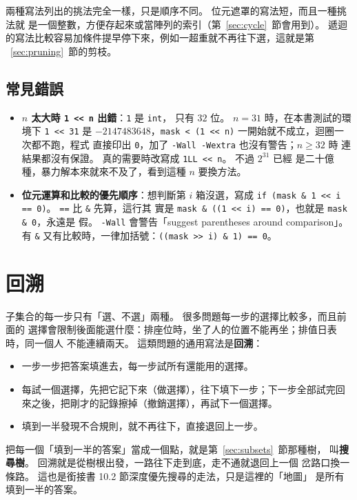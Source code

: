 兩種寫法列出的挑法完全一樣，只是順序不同。 位元遮罩的寫法短，而且一種挑法就
是一個整數，方便存起來或當陣列的索引（第~\ref{sec:cycle}~節會用到）。 遞迴
的寫法比較容易加條件提早停下來，例如一超重就不再往下選，這就是第
~\ref{sec:pruning}~節的剪枝。

\subsection{常見錯誤}

\begin{itemize}
\item \textbf{$n$ 太大時 \texttt{1 << n} 出錯}：\texttt{1} 是 \texttt{int}，
只有 $32$ 位。 $n = 31$ 時，在本書測試的環境下 \texttt{1 << 31} 是
$-2147483648$，\texttt{mask < (1 << n)} 一開始就不成立，迴圈一次都不跑，程式
直接印出 \texttt{0}，加了 \texttt{-Wall -Wextra} 也沒有警告；$n \ge 32$ 時
連結果都沒有保證。 真的需要時改寫成 \texttt{1LL << n}。 不過 $2^{31}$ 已經
是二十億種，暴力解本來就來不及了，看到這種 $n$ 要換方法。
\item \textbf{位元運算和比較的優先順序}：想判斷第 $i$ 箱沒選，寫成
\texttt{if (mask \& 1 << i == 0)}。 \texttt{==} 比 \texttt{\&} 先算，這行其
實是 \texttt{mask \& ((1 << i) == 0)}，也就是 \texttt{mask \& 0}，永遠是
假。 \texttt{-Wall} 會警告「suggest parentheses around comparison」。 有
\texttt{\&} 又有比較時，一律加括號：\texttt{((mask >> i) \& 1) == 0}。
\end{itemize}

\section{回溯}
\label{sec:backtracking}

子集合的每一步只有「選、不選」兩種。 很多問題每一步的選擇比較多，而且前面的
選擇會限制後面能選什麼：排座位時，坐了人的位置不能再坐；排值日表時，同一個人
不能連續兩天。 這類問題的通用寫法是\textbf{回溯}：

\begin{itemize}
\item 一步一步把答案填進去，每一步試所有還能用的選擇。
\item 每試一個選擇，先把它記下來（做選擇），往下填下一步；下一步全部試完回
來之後，把剛才的記錄擦掉（撤銷選擇），再試下一個選擇。
\item 填到一半發現不合規則，就不再往下，直接退回上一步。
\end{itemize}

把每一個「填到一半的答案」當成一個點，就是第~\ref{sec:subsets}~節那種樹，
叫\textbf{搜尋樹}。 回溯就是從樹根出發，一路往下走到底，走不通就退回上一個
岔路口換一條路。 這也是銜接書 10.2 節深度優先搜尋的走法，只是這裡的「地圖」
是所有填到一半的答案。

